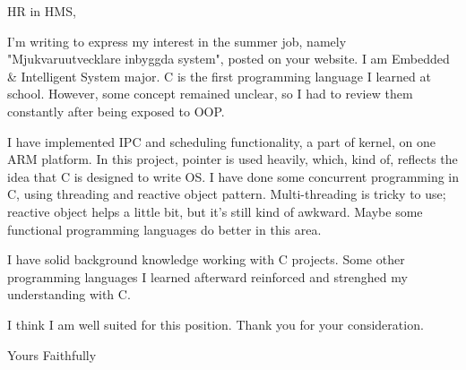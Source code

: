 \documentclass{letter}
\begin{document}
\begin{letter}{ }
	\opening{HR in HMS,}
	I'm writing to express my interest in the summer job, namely "Mjukvaruutvecklare inbyggda system", posted on your website. I am Embedded \& 
	Intelligent System major. C is the first programming language I learned at school. However, some concept remained unclear, so I had to review 
	them constantly after being exposed to OOP.

	I have implemented IPC and scheduling functionality, a part of kernel, on one ARM platform. In this project, pointer is used heavily, which, kind 
	of, reflects the idea that C is designed to write OS. I have done some concurrent programming in C, using threading and reactive object pattern. 
	Multi-threading is tricky to use; reactive object helps a little bit, but it's still kind of awkward. Maybe some functional programming languages 
	do better in this area.

	I have solid background knowledge working with C projects. Some other programming languages I learned afterward reinforced and strenghed my 
	understanding with C.

	I think I am well suited for this position. Thank you for your consideration.
	\closing{Yours Faithfully}
\end{letter}
\end{document}
